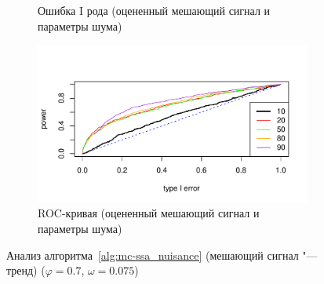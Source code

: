 \documentclass[specialist,
substylefile = spbu_report.rtx,
subf,href,colorlinks=true, 12pt]{disser}
\theoremstyle{definition}
\begin{document}
\begin{figure}[h!]
\begin{subfigure}[t]{0.5\textwidth}
		\caption{Ошибка I рода (оцененный мешающий сигнал и параметры шума)}
		\label{fig:trend_est_noise_signal_type1error}
	\end{subfigure}\hspace{\fill}
	\begin{subfigure}[t]{0.5\textwidth}
		\centering
		\includegraphics[width=\textwidth]{img/roc_trend_est_noise_signal.pdf}
		\caption{ROC-кривая (оцененный мешающий сигнал и параметры шума)}
		\label{fig:trend_est_noise_signal_roc}
	\end{subfigure}
	\caption{Анализ алгоритма~\ref{alg:mc-ssa_nuisance} (мешающий сигнал "--- тренд) ($\varphi=0.7$, $\omega=0.075$)}
\label{fig:trend}
\end{figure}

\end{document}
